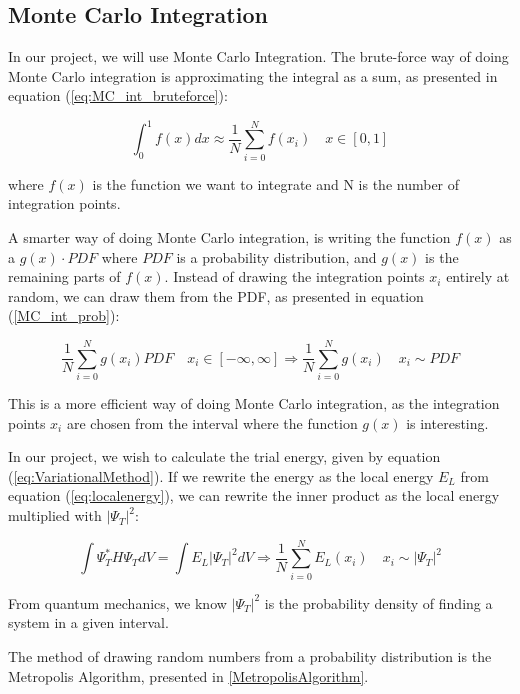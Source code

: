 \documentclass[norsk,a4paper,12pt]{article}
\begin{document}
\subsection{Monte Carlo Integration}
In our project, we will use Monte Carlo Integration. The brute-force way of doing Monte Carlo integration is approximating the integral as a sum, as presented in equation (\ref{eq:MC_int_bruteforce}):

\begin{equation}
    \int_0^1 f(x) dx \approx  \frac{1}{N}\sum_{i=0}^N f(x_i) \quad x \in [0,1]
    \label{eq:MC_int_bruteforce}
\end{equation}

where $f(x)$ is the function we want to integrate and N is the number of integration points. 

A smarter way of doing Monte Carlo integration, is writing the function $f(x)$ as a $g(x)\cdot PDF$ where $PDF$ is a probability distribution, and $g(x)$ is the remaining parts of $f(x)$. Instead of drawing the integration points $x_i$ entirely at random, we can draw them from the PDF, as presented in equation (\ref{MC_int_prob}):

\begin{equation}
    \frac{1}{N}\sum_{i=0}^N g(x_i) PDF \quad x_i \in [-\infty, \infty] \Rightarrow \frac{1}{N} \sum_{i=0}^N g(x_i) \quad x_i \sim PDF
    \label{MC_int_prob}
\end{equation}

This is a more efficient way of doing Monte Carlo integration, as the integration points $x_i$ are chosen from the interval where the function $g(x)$ is interesting.\par 

In our project, we wish to calculate the trial energy, given by equation (\ref{eq:VariationalMethod}). If we rewrite the energy as the local energy $E_L$ from equation (\ref{eq:localenergy}), we can rewrite the inner product as the local energy multiplied with $|\Psi_T|^2$:

\begin{equation}
    \int \Psi_T^* H \Psi_T dV = \int E_L |\Psi_T|^2 dV \Rightarrow \frac{1}{N} \sum_{i=0}^N E_L(x_i) \quad x_i \sim |\Psi_T|^2  
\end{equation}

From quantum mechanics, we know $|\Psi_T|^2$ is the probability density of finding a system in a given interval. 

The method of drawing random numbers from a probability distribution is the Metropolis Algorithm, presented in \ref{MetropolisAlgorithm}. 
\end{document}
